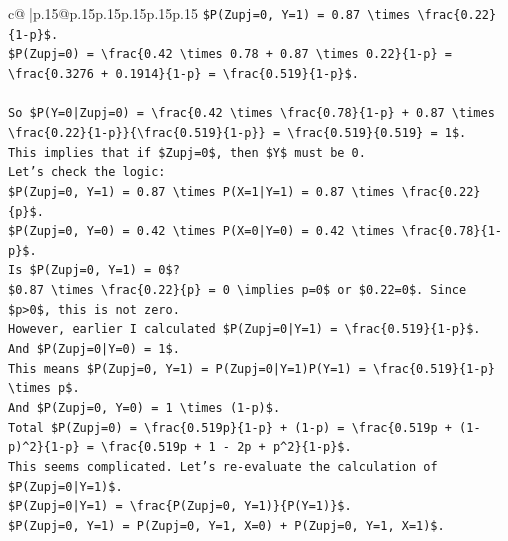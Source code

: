 \documentclass{article}
\begin{document}
{\begin{supertabular}{c@{$\;$}|p{.15\linewidth}@{}p{.15\linewidth}p{.15\linewidth}p{.15\linewidth}p{.15\linewidth}p{.15\linewidth}}
{{{\texttt{\$P(Zupj=0, Y=1) = 0.87 \textbackslash{}times \textbackslash{}frac\{0.22\}\{1{-}p\}\$.} \\
\texttt{\$P(Zupj=0) = \textbackslash{}frac\{0.42 \textbackslash{}times 0.78 + 0.87 \textbackslash{}times 0.22\}\{1{-}p\} = \textbackslash{}frac\{0.3276 + 0.1914\}\{1{-}p\} = \textbackslash{}frac\{0.519\}\{1{-}p\}\$.} \\
\\ 
\texttt{So \$P(Y=0|Zupj=0) = \textbackslash{}frac\{0.42 \textbackslash{}times \textbackslash{}frac\{0.78\}\{1{-}p\} + 0.87 \textbackslash{}times \textbackslash{}frac\{0.22\}\{1{-}p\}\}\{\textbackslash{}frac\{0.519\}\{1{-}p\}\} = \textbackslash{}frac\{0.519\}\{0.519\} = 1\$.} \\
\texttt{This implies that if \$Zupj=0\$, then \$Y\$ must be 0.} \\
\texttt{Let's check the logic:} \\
\texttt{\$P(Zupj=0, Y=1) = 0.87 \textbackslash{}times P(X=1|Y=1) = 0.87 \textbackslash{}times \textbackslash{}frac\{0.22\}\{p\}\$.} \\
\texttt{\$P(Zupj=0, Y=0) = 0.42 \textbackslash{}times P(X=0|Y=0) = 0.42 \textbackslash{}times \textbackslash{}frac\{0.78\}\{1{-}p\}\$.} \\
\texttt{Is \$P(Zupj=0, Y=1) = 0\$?} \\
\texttt{\$0.87 \textbackslash{}times \textbackslash{}frac\{0.22\}\{p\} = 0 \textbackslash{}implies p=0\$ or \$0.22=0\$. Since \$p>0\$, this is not zero.} \\
\texttt{However, earlier I calculated \$P(Zupj=0|Y=1) = \textbackslash{}frac\{0.519\}\{1{-}p\}\$.} \\
\texttt{And \$P(Zupj=0|Y=0) = 1\$.} \\
\texttt{This means \$P(Zupj=0, Y=1) = P(Zupj=0|Y=1)P(Y=1) = \textbackslash{}frac\{0.519\}\{1{-}p\} \textbackslash{}times p\$.} \\
\texttt{And \$P(Zupj=0, Y=0) = 1 \textbackslash{}times (1{-}p)\$.} \\
\texttt{Total \$P(Zupj=0) = \textbackslash{}frac\{0.519p\}\{1{-}p\} + (1{-}p) = \textbackslash{}frac\{0.519p + (1{-}p)\^{}2\}\{1{-}p\} = \textbackslash{}frac\{0.519p + 1 {-} 2p + p\^{}2\}\{1{-}p\}\$.} \\
\texttt{This seems complicated. Let's re{-}evaluate the calculation of \$P(Zupj=0|Y=1)\$.} \\
\texttt{\$P(Zupj=0|Y=1) = \textbackslash{}frac\{P(Zupj=0, Y=1)\}\{P(Y=1)\}\$.} \\
\texttt{\$P(Zupj=0, Y=1) = P(Zupj=0, Y=1, X=0) + P(Zupj=0, Y=1, X=1)\$.} \\
}}}
\end{supertabular}}
\end{document}
